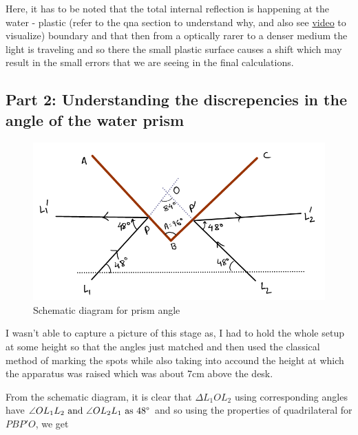 \documentclass[twocolumn,11pt]{article}
\begin{document}
\begin{tcolorbox}[width=8cm,colback={aqua},title={NOTE: The Boundary of Conern},colbacktitle=white,coltitle=black]    
    Here, it has to be noted that the total internal reflection is happening at the water - plastic (refer to the qna section to understand why, and also see \href{https://drive.google.com/file/d/1LkRDtIguU656zTk9ufa4VYrhkumaocmM/view?usp=drive_link}{video} to visualize) boundary and that then from a optically rarer to a denser medium the light is traveling and so there the small plastic surface causes a shift which may result in the small errors that we are seeing in the final calculations.
\end{tcolorbox}

\subsection{Part 2: Understanding the discrepencies in the angle of the water prism}
\begin{figure}[H]
    \centering
    \includegraphics[scale =0.4]{Schematic diagram for prism angle.png}
    \caption{Schematic diagram for prism angle}
    \label{Schematic diagram for prism angle}
\end{figure}

I wasn't able to capture a picture of this stage as, I had to hold the whole setup at some height so that the angles just matched and then used the classical method of marking the spots while also taking into accound the height at which the apparatus was raised which was about 7cm above the desk.

From the schematic diagram, it is clear that
$\Delta L_1OL_2 $ using corresponding angles have $\angle OL_1L_2 \text{ and } \angle OL_2L_1 \text{ as } 48\degree $ and so using the properties of quadrilateral for $PBP'O$, we get
\end{document}
